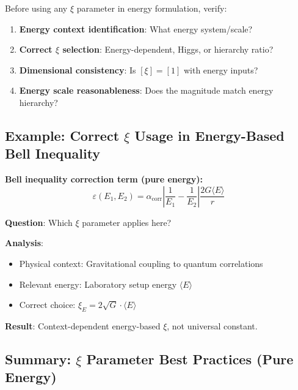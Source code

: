 \documentclass[12pt,a4paper]{article}
\begin{document}
Before using any $\xi$ parameter in energy formulation, verify:

\begin{enumerate}
	\item \textbf{Energy context identification}: What energy system/scale?
	\item \textbf{Correct $\xi$ selection}: Energy-dependent, Higgs, or hierarchy ratio?
	\item \textbf{Dimensional consistency}: Is $[\xi] = [1]$ with energy inputs?
	\item \textbf{Energy scale reasonableness}: Does the magnitude match energy hierarchy?
\end{enumerate}

\subsection{Example: Correct $\xi$ Usage in Energy-Based Bell Inequality}
\label{subsec:example_energy_bell}

\textbf{Bell inequality correction term (pure energy):}
\begin{equation}
	\varepsilon(E_1, E_2) = \alpha_{\text{corr}} \left|\frac{1}{E_1} - \frac{1}{E_2}\right| \frac{2G\langle E \rangle}{r}
\end{equation}

\textbf{Question}: Which $\xi$ parameter applies here?

\textbf{Analysis}: 
\begin{itemize}
	\item Physical context: Gravitational coupling to quantum correlations
	\item Relevant energy: Laboratory setup energy $\langle E \rangle$
	\item Correct choice: $\xi_E = 2\sqrt{G} \cdot \langle E \rangle$
\end{itemize}

\textbf{Result}: Context-dependent energy-based $\xi$, not universal constant.

\subsection{Summary: $\xi$ Parameter Best Practices (Pure Energy)}
\label{subsec:xi_best_practices}
\end{document}

